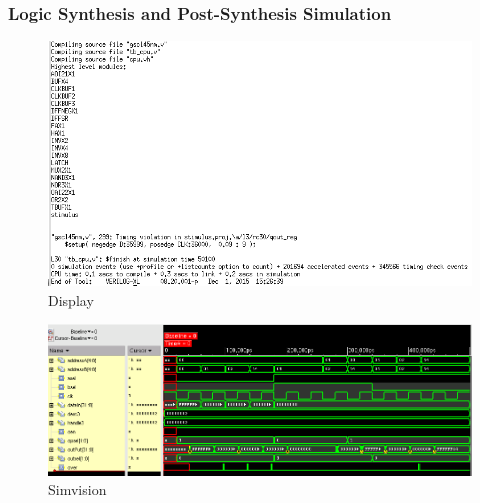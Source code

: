 \documentclass[12pt]{article}
\begin{document}
\subsubsection{Logic Synthesis and Post-Synthesis Simulation}
\begin{figure}[H]
\centering
\includegraphics[width=.7\linewidth]{../CRA/synth-text}
\caption{Display}
\label{fig:synth-text}
\end{figure}
\begin{figure}[H]
\centering
\includegraphics[width=\linewidth]{../CRA/synth-test}
\caption{Simvision}
\label{fig:synth-test}
\end{figure}
\end{document}
